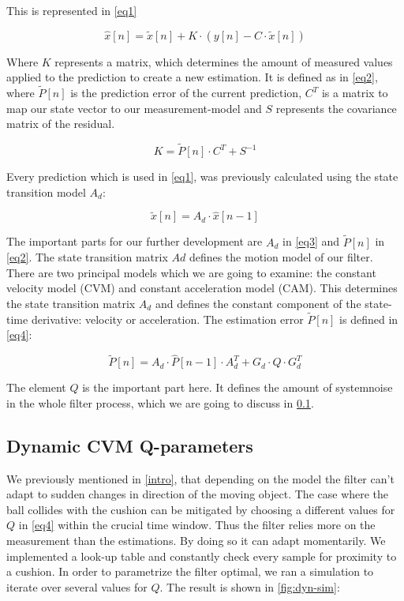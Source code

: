 \documentclass[notitlepage, a4paper, 11pt]{scrartcl}
\begin{document}
\begin{multicols}{2}
This is represented in \cref{eq1}

\begin{equation} 
    \label{eq1}
    \hat{x}[n]=\tilde{x}[n]+K\cdot(y[n]-C\cdot\tilde{x}[n])
\end{equation}

Where $K$ represents a matrix, which determines the amount of measured values applied to the prediction to create a new estimation. It is defined as in \cref{eq2}, 
where $\tilde{P}[n]$ is the prediction error of the current prediction, $C^T$ is a matrix to map our state vector to our measurement-model and $S$ represents the covariance matrix of the residual.

\begin{equation} 
    \label{eq2}
    K=\tilde{P}[n]\cdot C^T+S^{-1}
\end{equation}

Every prediction which is used in \cref{eq1}, was previously calculated using the state transition model $A_d$:

\begin{equation} 
    \label{eq3}
    \tilde{x}[n]=A_d\cdot\hat{x}[n-1]
\end{equation}

The important parts for our further development are $A_d$ in \cref{eq3} and $\tilde{P}[n]$ in \cref{eq2}. The state transition matrix $Ad$ defines the motion model of our filter.
There are two principal models which we are going to examine: 
the constant velocity model (CVM) and constant acceleration model (CAM). This determines the state transition matrix $A_d$ and defines the constant component of the state-time derivative: velocity or acceleration.
The estimation error $\tilde{P}[n]$ is defined in \cref{eq4}:

\begin{equation} 
    \label{eq4}
    \tilde{P}[n]=A_d\cdot\hat{P}[n-1]\cdot A_d^T+G_d\cdot Q\cdot G_d^T
\end{equation}

The element $Q$ is the important part here. It defines the amount of systemnoise in the whole filter process, which we are going to discuss in \cref{dynamic-q}.

\subsection{Dynamic CVM Q-parameters} \label{dynamic-q}

We previously mentioned in \cref{intro}, that depending on the model the filter can't adapt to sudden changes in direction of the moving object. 
The case where the ball collides with the cushion can be mitigated by choosing a different values for $Q$ in \cref{eq4} within the crucial time window.
Thus the filter relies more on the measurement than the estimations. By doing so it can adapt momentarily.
We implemented a look-up table and constantly check every sample for proximity to a cushion.
In order to parametrize the filter optimal, we ran a simulation to iterate over several values for $Q$. The result is shown in \cref{fig:dyn-sim}:


\end{multicols}
\end{document}

